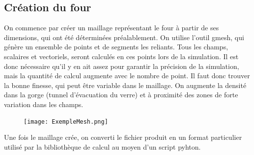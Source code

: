 \documentclass[12pt, a4paper, french, BCOR = 0pt, DIV = 10]{scrartcl}
\begin{document}
    \subsection{Création du four}
    On commence par créer un maillage représentant le four à partir de ses dimensions, qui ont été déterminées préalablement. On utilise l'outil gmesh, qui génère un ensemble de points et de segments les reliants. Tous les champs, scalaires et vectoriels, seront calculés en ces points lors de la simulation. Il est donc nécessaire qu'il y en ait assez pour garantir la précision de la simulation, mais la quantité de calcul augmente avec le nombre de point. Il faut donc trouver la bonne finesse, qui peut être variable dans le maillage. On augmente la densité dans la gorge (tunnel d'évacuation du verre) et à proximité des zones de forte variation dans les champs.
    
    \begin{center}
        \begin{figure}[H]
            \texttt{[image: ExempleMesh.png]}
        \end{figure}
    \end{center}

    Une fois le maillage crée, on converti le fichier produit en un format particulier utilisé par la bibliothèque de calcul au moyen d'un script pyhton.
\end{document}
